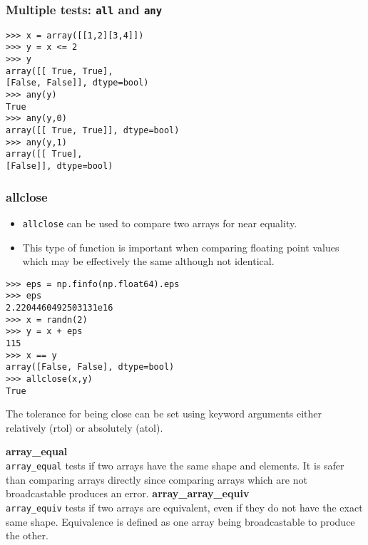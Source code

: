 \documentclass[KSmainSlides.tex]{subfiles}
\begin{document}
\begin{frame}[fragile]
	\frametitle{Multiple tests: \texttt{all} and \texttt{any}}
\begin{framed}
\begin{verbatim}
>>> x = array([[1,2][3,4]])
>>> y = x <= 2
>>> y
array([[ True, True],
[False, False]], dtype=bool)
>>> any(y)
True
>>> any(y,0)
array([[ True, True]], dtype=bool)
>>> any(y,1)
array([[ True],
[False]], dtype=bool)
\end{verbatim}
\end{framed}
\end{frame}
\begin{frame}[fragile]
	\frametitle{allclose}
\begin{itemize}
\item \texttt{allclose} can be used to compare two arrays for near equality.
\item  This type of function is important when
comparing floating point values which may be effectively the same although not identical.
\end{itemize}

\end{frame}
\begin{frame}[fragile]
\begin{framed}
\begin{verbatim}
>>> eps = np.finfo(np.float64).eps
>>> eps
2.2204460492503131e16
>>> x = randn(2)
>>> y = x + eps
115
>>> x == y
array([False, False], dtype=bool)
>>> allclose(x,y)
True
\end{verbatim}
\end{framed}
\end{frame}
\begin{frame}[fragile]
The tolerance for being close can be set using keyword arguments either relatively (rtol) or absolutely
(atol).
\end{frame}
\begin{frame}[fragile]
\textbf{array\_equal}\\
\texttt{array\_equal} tests if two arrays have the same shape and elements. It is safer than comparing arrays directly
since comparing arrays which are not broadcastable produces an error.
\textbf{array\_array\_equiv}\\
\texttt{array\_equiv} tests if two arrays are equivalent, even if they do not have the exact same shape. Equivalence
is defined as one array being broadcastable to produce the other.
\end{frame}
\end{document}
